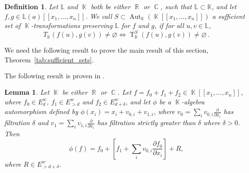 \documentclass[noend]{amsproc}
\newtheorem{defn}[theorem]{Definition}
\newtheorem{lemma}[theorem]{Lemma}
\theoremstyle{definition}
\DeclareMathOperator{\R}{\mathbb{R}}
\DeclareMathOperator{\C}{\mathbb{C}}
\DeclareMathOperator{\K}{\mathbb{K}}
\DeclareMathOperator{\T}{T}
\DeclareMathOperator{\Aut}{Aut}
\begin{document}
\begin{defn}
Let $\mathbb L$ and $\K$ both be either $\R$ or $\C$, such that $\mathbb L\subset\mathbb K$, and let $f,g\in\mathbb L(a)[[x_1,\ldots,x_n]]$. We call $S\subset \Aut_{\K}(\K[[x_1,\ldots,x_n]])$ a sufficient set of $\K$-transformations preserving $\mathbb L$ for $f$ and $g$, if for all $u,v\in\mathbb L$,  
\[T_{\K}(f(u),g(v))\neq\varnothing\Leftrightarrow \T_{\K}^S(f(u),g(v))\neq\varnothing\,.\]
\end{defn}
We need the following result to prove the main result of this section, Theorem~\ref{tab:sufficient_sets}.

The following result is proven in \cite{A1975}.
\begin{lemma}\label{vectorlemma}
Let $\K$ be either $\R$ or $\C$. Let $f=f_0+f_1+f_2\in\K[[x_1,\ldots,x_n]]$, where $f_0\in E^w_d$, $f_1\in E^w_{>d}$ and $f_2\in E^w_{d+\delta}$, and let $\phi$ be a $\K$-algebra automorphism defined by $\phi(x_i)=x_i+v_{0,i}+v_{1,i}$, where $v_0=\sum_iv_{0,i}\frac{\partial}{\partial x_i}$ has filtration $\delta$ and $v_1=\sum_iv_{1,i}\frac{\partial}{\partial x_i}$ has filtration strictly greater than $\delta$ where $\delta>0$. Then
\[\phi(f)=f_0+\left[ f_1+\sum_iv_{0,i}\frac{\partial f_0}{\partial x_i}\right]+R,\]
where $R\in E^w_{>d+\delta}$.
\end{lemma}
\end{document}
